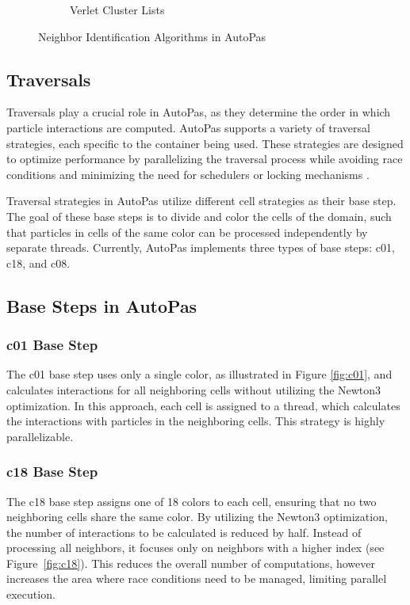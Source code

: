 \begin{figure}[h!]
\begin{subfigure}{0.22\textwidth}
        \caption{\scriptsize Verlet Cluster Lists}
        \label{fig:verletclusters}
    \end{subfigure}
    \caption{Neighbor Identification Algorithms in AutoPas \parencite{gratl2022n}}
\end{figure}



\subsection{Traversals}

Traversals play a crucial role in AutoPas, as they determine the order in which particle interactions are computed. AutoPas supports a variety of traversal strategies, each specific to the container being used. These strategies are designed to optimize performance by parallelizing the traversal process while avoiding race conditions and minimizing the need for schedulers or locking mechanisms \parencite{gratl2019autopas}.

Traversal strategies in AutoPas utilize different cell strategies as their base step. The goal of these base steps is to divide and color the cells of the domain, such that particles in cells of the same color can be processed independently by separate threads. Currently, AutoPas implements three types of base steps: c01, c18, and c08. 

\subsection{Base Steps in AutoPas}

\subsubsection{c01 Base Step} The c01 base step uses only a single color, as illustrated in Figure \ref{fig:c01}, and calculates interactions for all neighboring cells without utilizing the Newton3 optimization. In this approach, each cell is assigned to a thread, which calculates the interactions with particles in the neighboring cells. This strategy is highly parallelizable.

\subsubsection{c18 Base Step} The c18 base step assigns one of 18 colors to each cell, ensuring that no two neighboring cells share the same color. By utilizing the Newton3 optimization, the number of interactions to be calculated is reduced by half. Instead of processing all neighbors, it focuses only on neighbors with a higher index (see Figure~\ref{fig:c18}). This reduces the overall number of computations, however increases the area where race conditions need to be managed, limiting parallel execution.

